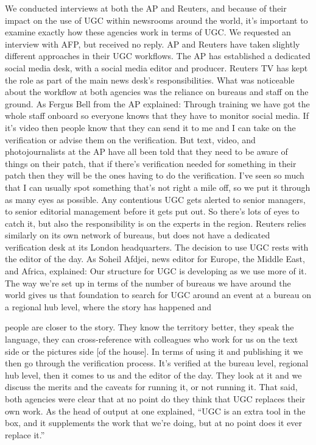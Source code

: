 \documentclass[symmetric, notoc, nobib]{towcenter-book}
\begin{document}
\begin{enumerate}
We conducted interviews at both the AP and Reuters, and because of their
impact on the use of UGC within newsrooms around the world, it's important
to examine exactly how these agencies work in terms of UGC. We
requested an interview with AFP, but received no reply.
AP and Reuters have taken slightly different approaches in their UGC workflows.
The AP has established a dedicated social media desk, with a social
media editor and producer. Reuters TV has kept the role as part of the main
news desk's responsibilities. What was noticeable about the workflow at
both agencies was the reliance on bureaus and staff on the ground. As Fergus
Bell from the AP explained:
Through training we have got the whole staff onboard so everyone
knows that they have to monitor social media. If it's video then people
know that they can send it to me and I can take on the verification
or advise them on the verification. But text, video, and photojournalists
at the AP have all been told that they need to be aware of things
on their patch, that if there's verification needed for something in
their patch then they will be the ones having to do the verification.
I've seen so much that I can usually spot something that's not right a
mile off, so we put it through as many eyes as possible. Any contentious
UGC gets alerted to senior managers, to senior editorial management
before it gets put out. So there's lots of eyes to catch it, but
also the responsibility is on the experts in the region.
Reuters relies similarly on its own network of bureaus, but does not have
a dedicated verification desk at its London headquarters. The decision to
use UGC rests with the editor of the day. As Soheil Afdjei, news editor for
Europe, the Middle East, and Africa, explained:
Our structure for UGC is developing as we use more of it. The way
we're set up in terms of the number of bureaus we have around the
world gives us that foundation to search for UGC around an event at
a bureau on a regional hub level, where the story has happened and

people are closer to the story. They know the territory better, they
speak the language, they can cross-reference with colleagues who
work for us on the text side or the pictures side [of the house]. In
terms of using it and publishing it we then go through the verification
process. It's verified at the bureau level, regional hub level, then
it comes to us and the editor of the day. They look at it and we discuss
the merits and the caveats for running it, or not running it.
That said, both agencies were clear that at no point do they think that UGC
replaces their own work. As the head of output at one explained, ``UGC is
an extra tool in the box, and it supplements the work that we're doing, but
at no point does it ever replace it.''
\end{enumerate}
\end{document}
